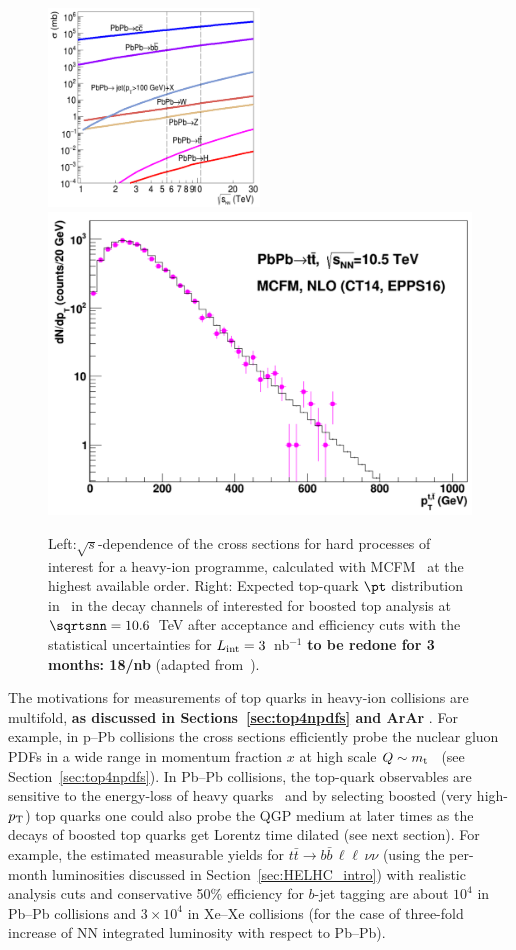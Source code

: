\documentclass[../report.tex]{subfiles}
\begin{document}
\begin{figure}[!h]
\begin{center}
\includegraphics[width=0.5\textwidth]{helhc/figs/xsecVSsqrts.pdf}
\hfill
\includegraphics[width=0.48\columnwidth]{helhc/figs/toppT_HE_PbPb3nb.pdf}
\caption{Left:$\sqrt s$-dependence of the cross sections for hard processes of
  interest for a heavy-ion programme, calculated with MCFM~\cite{Campbell:2010ff}
at the highest available order. 
  Right: Expected top-quark $\pt$ distribution in \PbPb\ in the
  decay channels of interested for boosted top analysis at $\sqrtsnn=10.6$~TeV after acceptance and
  efficiency cuts with the statistical uncertainties
  for $L_{\rm int}=3$~nb$^{-1}$ {\bf to be redone for 3 months: 18/nb} (adapted from~\cite{dEnterria:2015mgr}).}
\label{fig:hardXsectHIC}
\end{center}
\end{figure}





The motivations for measurements of top quarks in heavy-ion collisions
are multifold, {\bf as discussed in Sections~\ref{sec:top4npdfs} and ArAr} . For example, in
p--Pb collisions the cross sections efficiently probe the nuclear
gluon PDFs in a wide range in momentum fraction
$x$ at high scale $Q\sim m_{\rm t}$~\cite{dEnterria:2015mgr} (see Section~\ref{sec:top4npdfs}). In Pb--Pb
collisions, the top-quark observables are sensitive to the energy-loss of heavy quarks~\cite{Baskakov:2015nxa}
and by selecting boosted (very high-$p_{\rm T}$) top quarks one could also probe the QGP medium at later times as the decays of boosted top quarks get Lorentz
time dilated (see next section). 
For example, the estimated measurable yields  for $t\bar t\to b\bar b\,\ell\ell\,\nu\nu$ (using the
 per-month luminosities discussed in Section~\ref{sec:HELHC_intro}) with
realistic analysis cuts 
and conservative 50\% efficiency for $b$-jet tagging are
about $10^4$ in Pb--Pb collisions and $3\times 10^4$ in Xe--Xe collisions (for the case of three-fold increase of NN integrated luminosity with respect to Pb--Pb).
\end{document}
